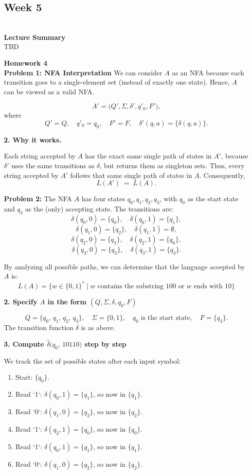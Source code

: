 \documentclass{article}
\theoremstyle{theorem}
\theoremstyle{definition}
\theoremstyle{remark}
\begin{document}
\subsection{\textbf{Week 5}}\\
\textbf{Lecture Summary}\\
TBD

\textbf{Homework 4}\\
\textbf{Problem 1: NFA Interpretation}
We can consider $A$ as an NFA because each transition goes to a 
single-element set (instead of exactly one state). Hence, $A$ 
can be viewed as a valid NFA.

\[
A' = \bigl(Q', \Sigma, \delta', q'_0, F'\bigr),
\]
where
\[
Q' = Q, 
\quad
q'_0 = q_0, 
\quad
F' = F,
\quad
\delta'(q,a) = \{\delta(q,a)\}.
\]

\textbf{2. Why it works.}

Each string accepted by $A$ has the exact same single path of states 
in $A'$, because $\delta'$ uses the same transitions as $\delta$, 
but returns them as singleton sets. 
Thus, every string accepted by $A'$ follows that same single path of 
states in $A$. Consequently,
\[
L(A') \;=\; L(A).
\]

\textbf{Problem 2:}
The NFA $A$ has four states $q_0, q_1, q_2, q_3$, with $q_0$ as the 
start state and $q_3$ as the (only) accepting state. The transitions are:
\[
\delta(q_0,0) = \{q_0\}, \quad
\delta(q_0,1) = \{q_1\},
\]
\[
\delta(q_1,0) = \{q_2\}, \quad
\delta(q_1,1) = \emptyset,
\]
\[
\delta(q_2,0) = \{q_3\}, \quad
\delta(q_2,1) = \{q_0\},
\]
\[
\delta(q_3,0) = \{q_3\}, \quad
\delta(q_3,1) = \{q_3\}.
\]

By analyzing all possible paths, we can determine that the language accepted by $A$ is:
\[
L(A) = \{w \in \{0,1\}^* \mid w \text{ contains the substring } 100 \text{ or } w \text{ ends with } 10\}
\]

\textbf{2. Specify $A$ in the form $(Q,\Sigma,\delta,q_0,F)$}

\[
Q = \{q_0,\, q_1,\, q_2,\, q_3\}, \quad
\Sigma = \{0,1\}, \quad
q_0 \text{ is the start state}, \quad
F = \{q_3\}.
\]
The transition function $\delta$ is as above.

\textbf{3. Compute $\hat{\delta}\bigl(q_0,\,10110\bigr)$ step by step}

We track the set of possible states after each input symbol:

\begin{enumerate}
\item Start: $\{q_0\}$.
\item Read `1`: $\delta(q_0,1) = \{q_1\}$, so now in $\{q_1\}$.
\item Read `0`: $\delta(q_1,0) = \{q_2\}$, so now in $\{q_2\}$.
\item Read `1`: $\delta(q_2,1) = \{q_0\}$, so now in $\{q_0\}$.
\item Read `1`: $\delta(q_0,1) = \{q_1\}$, so now in $\{q_1\}$.
\item Read `0`: $\delta(q_1,0) = \{q_2\}$, so now in $\{q_2\}$.
\end{enumerate}
\end{document}
